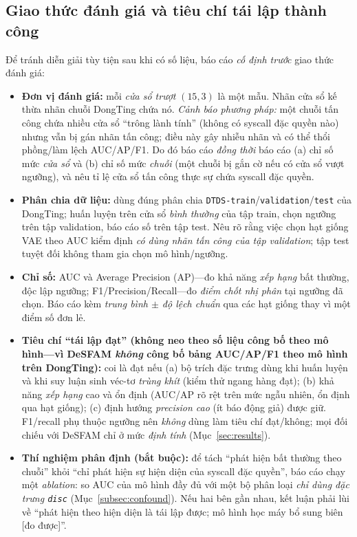 \subsection{Giao thức đánh giá và tiêu chí tái lập thành công}
\label{subsec:protocol}
Để tránh diễn giải tùy tiện sau khi có số liệu, báo cáo \emph{cố định trước} giao
thức đánh giá:
\begin{itemize}[leftmargin=1.6em]
  \item \textbf{Đơn vị đánh giá:} mỗi \emph{cửa sổ trượt} $(15,3)$ là một mẫu. Nhãn
        cửa sổ kế thừa nhãn chuỗi DongTing chứa nó. \emph{Cảnh báo phương pháp:} một
        chuỗi tấn công chứa nhiều cửa sổ ``trông lành tính'' (không có syscall đặc
        quyền nào) nhưng vẫn bị gán nhãn tấn công; điều này gây nhiễu nhãn và có thể
        thổi phồng/làm lệch AUC/AP/F1. Do đó báo cáo \emph{đồng thời} báo cáo (a) chỉ
        số mức \emph{cửa sổ} và (b) chỉ số mức \emph{chuỗi} (một chuỗi bị gắn cờ nếu
        có cửa sổ vượt ngưỡng), và nêu tỉ lệ cửa sổ tấn công thực sự chứa syscall đặc
        quyền.
  \item \textbf{Phân chia dữ liệu:} dùng đúng phân chia
        \texttt{DTDS-train}/\texttt{validation}/\texttt{test} của DongTing; huấn
        luyện trên cửa sổ \emph{bình thường} của tập train, chọn ngưỡng trên tập
        validation, báo cáo số trên tập test. Nêu rõ rằng việc chọn hạt giống VAE
        theo AUC kiểm định \emph{có dùng nhãn tấn công của tập validation}; tập test
        tuyệt đối không tham gia chọn mô hình/ngưỡng.
  \item \textbf{Chỉ số:} AUC và Average Precision (AP)---đo khả năng \emph{xếp hạng}
        bất thường, độc lập ngưỡng; F1/Precision/Recall---đo \emph{điểm chốt nhị
        phân} tại ngưỡng đã chọn. Báo cáo kèm \emph{trung bình $\pm$ độ lệch chuẩn}
        qua các hạt giống thay vì một điểm số đơn lẻ.
  \item \textbf{Tiêu chí ``tái lập đạt'' (không neo theo số liệu công bố theo mô
        hình---vì DeSFAM \emph{không} công bố bảng AUC/AP/F1 theo mô hình trên
        DongTing):} coi là đạt nếu (a) bộ trích đặc trưng dùng khi huấn luyện và khi
        suy luận sinh véc-tơ \emph{trùng khít} (kiểm thử ngang hàng đạt); (b) khả năng \emph{xếp
        hạng} cao và ổn định (AUC/AP rõ rệt trên mức ngẫu nhiên, ổn định qua hạt
        giống); (c) định hướng \emph{precision cao} (ít báo động giả) được giữ.
        F1/recall phụ thuộc ngưỡng nên \emph{không} dùng làm tiêu chí đạt/không; mọi
        đối chiếu với DeSFAM chỉ ở mức \emph{định tính} (Mục~\ref{sec:results}).
  \item \textbf{Thí nghiệm phân định (bắt buộc):} để tách ``phát hiện bất thường theo
        chuỗi'' khỏi ``chỉ phát hiện sự hiện diện của syscall đặc quyền'', báo cáo
        chạy một \emph{ablation}: so AUC của mô hình đầy đủ với một bộ phân loại
        \emph{chỉ dùng đặc trưng \texttt{disc}} (Mục~\ref{subsec:confound}). Nếu hai
        bên gần nhau, kết luận phải lùi về ``phát hiện theo hiện diện là tái lập
        được; mô hình học máy bổ sung biên [đo được]''.
\end{itemize}

